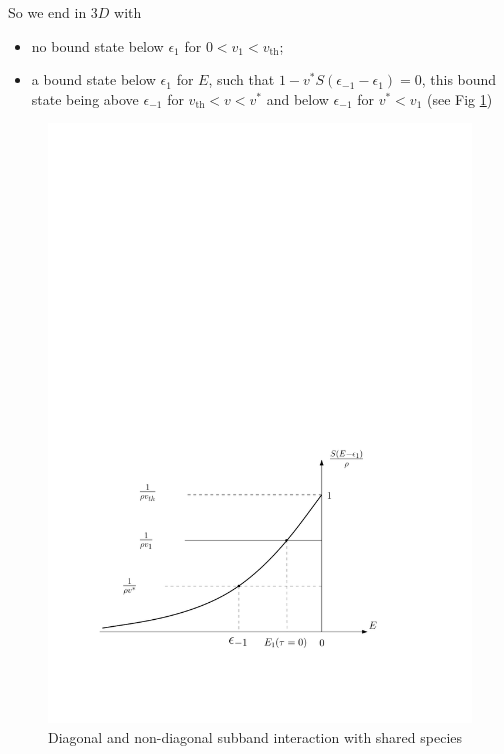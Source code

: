 \documentclass[11pt]{article} %
\begin{document}
So we end in $3D$ with
\begin{itemize}
\item no bound state below $\epsilon_{1}$ for $0<v_{1}<v_{\text{th}}$;
\item a bound state below $\epsilon_{1}$ for $E$, such that $1-v^{*}S(\epsilon_{-1}-\epsilon_{1})=0$, this bound state being above $\epsilon_{-1}$ for $v_{\text{th}}<v<v^{{*}}$ and below $\epsilon_{-1}$ for $v^{*}<v_{1}$ (see Fig \ref{fig:sDetail})
\end{itemize}
\begin{figure}[htb]
	\centering
	       \includegraphics[width=.6\textwidth]{sDetail}
			\caption{Diagonal and non-diagonal subband interaction with shared species \label{fig:sDetail}}
\end{figure}
\end{document}
